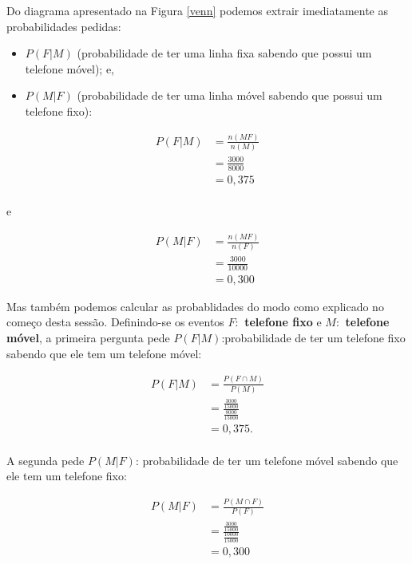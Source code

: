 \documentclass[
]{book}
\providecommand{\tightlist}{%
  \setlength{\itemsep}{0pt}\setlength{\parskip}{0pt}}
\begin{document}
\hfill\break

Do diagrama apresentado na Figura \ref{venn} podemos extrair imediatamente as probabilidades pedidas:

\begin{itemize}
\tightlist
\item
  \(P(F|M)\) (probabilidade de ter uma linha fixa sabendo que possui um telefone móvel); e,
\item
  \(P(M|F)\) (probabilidade de ter uma linha móvel sabendo que possui um telefone fixo):
\end{itemize}

\hfill\break

\begin{align*}
P(F|M) & = \frac{n(MF)}{n(M)}\\
       & =\frac{3000}{8000}\\
       & = 0,375 
\end{align*}\\

e

\hfill\break

\begin{align*}
P(M|F) & = \frac{n(MF)}{n(F)} \\
       & =\frac{3000}{10000} \\
       & = 0,300 
\end{align*}

\hfill\break

Mas também podemos calcular as probablidades do modo como explicado no começo desta sessão. Definindo-se os eventos \textbf{\(F:\) telefone fixo} e \textbf{\(M:\) telefone móvel}, a primeira pergunta pede \(P(F|M)\):probabilidade de ter um telefone fixo sabendo que ele tem um telefone móvel:

\hfill\break

\begin{align*}
P(F|M) & =  \frac{P(F \cap M)}{P(M)} \\
       & = \frac{ \frac{3000}{15000} }{\frac{8000}{15000} }\\
       & = 0,375.
\end{align*}\\

A segunda pede \(P(M|F)\): probabilidade de ter um telefone móvel sabendo que ele tem um telefone fixo:

\hfill\break

\begin{align*}
P(M|F) & = \frac{P(M \cap F)}{P(F)} \\
       & = \frac{ \frac{3000}{15000} }{\frac{10000}{15000} } \\
       & = 0,300
\end{align*}
\end{document}
